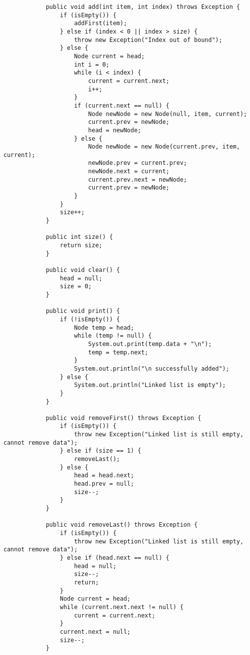 \documentclass[12pt,titlepage]{article}
\begin{document}
\begin{enumerate}
\begin{verbatim}
            public void add(int item, int index) throws Exception {
                if (isEmpty()) {
                    addFirst(item);
                } else if (index < 0 || index > size) {
                    throw new Exception("Index out of bound");
                } else {
                    Node current = head;
                    int i = 0;
                    while (i < index) {
                        current = current.next;
                        i++;
                    }
                    if (current.next == null) {
                        Node newNode = new Node(null, item, current);
                        current.prev = newNode;
                        head = newNode;
                    } else {
                        Node newNode = new Node(current.prev, item, current);
                        newNode.prev = current.prev;
                        newNode.next = current;
                        current.prev.next = newNode;
                        current.prev = newNode;
                    }
                }
                size++;
            }

            public int size() {
                return size;
            }

            public void clear() {
                head = null;
                size = 0;
            }

            public void print() {
                if (!isEmpty()) {
                    Node temp = head;
                    while (temp != null) {
                        System.out.print(temp.data + "\n");
                        temp = temp.next;
                    }
                    System.out.println("\n successfully added");
                } else {
                    System.out.println("Linked list is empty");
                }
            }

            public void removeFirst() throws Exception {
                if (isEmpty()) {
                    throw new Exception("Linked list is still empty, cannot remove data");
                } else if (size == 1) {
                    removeLast();
                } else {
                    head = head.next;
                    head.prev = null;
                    size--;
                }
            }

            public void removeLast() throws Exception {
                if (isEmpty()) {
                    throw new Exception("Linked list is still empty, cannot remove data");
                } else if (head.next == null) {
                    head = null;
                    size--;
                    return;
                } 
                Node current = head;
                while (current.next.next != null) {
                    current = current.next;
                }
                current.next = null;
                size--;
            }


\end{verbatim}
\end{enumerate}
\end{document}
